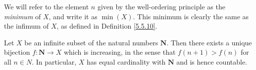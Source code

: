 \begin{note}
    We will refer to the element \(n\) given by the well-ordering principle as the \emph{minimum} of \(X\), and write it as \(\min(X)\).
    This minimum is clearly the same as the infimum of \(X\), as defined in Definition \ref{5.5.10}.
\end{note}

\begin{proposition}\label{8.1.5}
    Let \(X\) be an infinite subset of the natural numbers \(\mathbf{N}\).
    Then there exists a unique bijection \(f : \mathbf{N} \to X\) which is increasing, in the sense that \(f(n + 1) > f(n)\) for all \(n \in N\).
    In particular, \(X\) has equal cardinality with \(\mathbf{N}\) and is hence countable.
\end{proposition}

